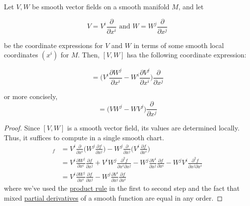 \documentclass{article}
\begin{document}
    \begin{lemma}
      \label{thm:lie-bracket-in-coordinates}
      Let $V, W$ be smooth vector fields on a smooth manifold $M$, and let

        \begin{equation}
          V = V^i \frac{\partial}{\partial x^i} \text{ and } W = W^j \frac{\partial}{\partial x^j}
        \end{equation}

      be the coordinate expressions for $V$ and $W$ in terms of some smooth local coordinates $(x^i)$ for $M$. Then, $[V, W]$ hsa the following coordinate expression: 

        \begin{equation}
          [V, W] = \bigg( V^i \frac{\partial W^j}{\partial x^i} - W^i \frac{\partial V^j}{\partial x^i}\bigg) \frac{\partial}{\partial x^j}
        \end{equation}

      or more concisely, 
        \begin{equation}
          [V, W] = \big(V W^j - W V^j \big) \frac{\partial}{\partial x^j}
        \end{equation}
    \end{lemma}
    \begin{proof}
      Since $[V, W]$ is a smooth vector field, its values are determined locally. Thus, it suffices to compute in a single smooth chart. 
      \begin{align*}
        [V,W]_f & = V^i \frac{\partial}{\partial x^i} \bigg( W^j \frac{\partial f}{\partial x^j} \bigg) - W^j \frac{\partial}{\partial x^j} \bigg( V^i \frac{\partial f}{\partial x^i} \bigg) \\
        & = V^i \frac{\partial W^j}{\partial x^i} \frac{\partial f}{\partial x^j} + V^i W^j \frac{\partial^2 f}{\partial x^i \partial x^j} - W^j \frac{\partial V^i}{\partial x^j} \frac{\partial f}{\partial x^i} - W^j V^i \frac{\partial^2 f}{\partial x^j \partial x^i} \\
        & = V^i \frac{\partial W^j}{\partial x^i} \frac{\partial f}{\partial x^j} - W^j \frac{\partial V^i}{\partial x^j} \frac{\partial f}{\partial x^i}
      \end{align*}
      where we've used the \hyperref[mv-thm:product-rule-2]{product rule} in the first to second step and the fact that mixed \hyperref[mv-def:partial-derivative]{partial derivatives} of a smooth function are equal in any order. 
    \end{proof}
\end{document}
